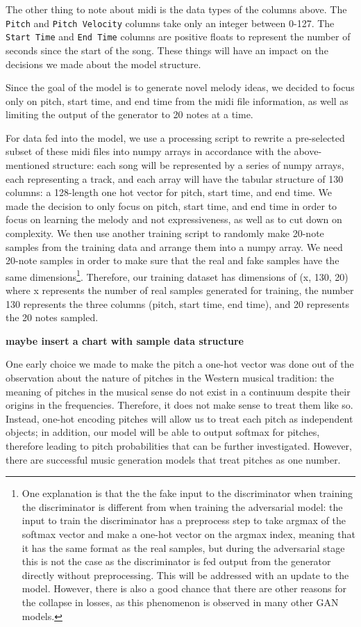 \documentclass[12pt,oneside]{chicagocapstone}
\begin{document}
The other thing to note about midi is the data types of the columns above. The \texttt{Pitch} and \texttt{Pitch\ Velocity} columns take only an integer between 0-127. The \texttt{Start\ Time} and \texttt{End\ Time} columns are positive floats to represent the number of seconds since the start of the song. These things will have an impact on the decisions we made about the model structure.

Since the goal of the model is to generate novel melody ideas, we decided to focus only on pitch, start time, and end time from the midi file information, as well as limiting the output of the generator to 20 notes at a time.

For data fed into the model, we use a processing script to rewrite a pre-selected subset of these midi files into numpy arrays in accordance with the above-mentioned structure: each song will be represented by a series of numpy arrays, each representing a track, and each array will have the tabular structure of 130 columns: a 128-length one hot vector for pitch, start time, and end time. We made the decision to only focus on pitch, start time, and end time in order to focus on learning the melody and not expressiveness, as well as to cut down on complexity. We then use another training script to randomly make 20-note samples from the training data and arrange them into a numpy array. We need 20-note samples in order to make sure that the real and fake samples have the same dimensions\footnote{One explanation is that the the fake input to the discriminator when training the discriminator is different from when training the adversarial model: the input to train the discriminator has a preprocess step to take argmax of the softmax vector and make a one-hot vector on the argmax index, meaning that it has the same format as the real samples, but during the adversarial stage this is not the case as the discriminator is fed output from the generator directly without preprocessing. This will be addressed with an update to the model. However, there is also a good chance that there are other reasons for the collapse in losses, as this phenomenon is observed in many other GAN models.}. Therefore, our training dataset has dimensions of (x, 130, 20) where x represents the number of real samples generated for training, the number 130 represents the three columns (pitch, start time, end time), and 20 represents the 20 notes sampled.

\textbf{maybe insert a chart with sample data structure}

One early choice we made to make the pitch a one-hot vector was done out of the observation about the nature of pitches in the Western musical tradition: the meaning of pitches in the musical sense do not exist in a continuum despite their origins in the frequencies. Therefore, it does not make sense to treat them like so. Instead, one-hot encoding pitches will allow us to treat each pitch as independent objects; in addition, our model will be able to output softmax for pitches, therefore leading to pitch probabilities that can be further investigated. However, there are successful music generation models that treat pitches as one number.
\end{document}
